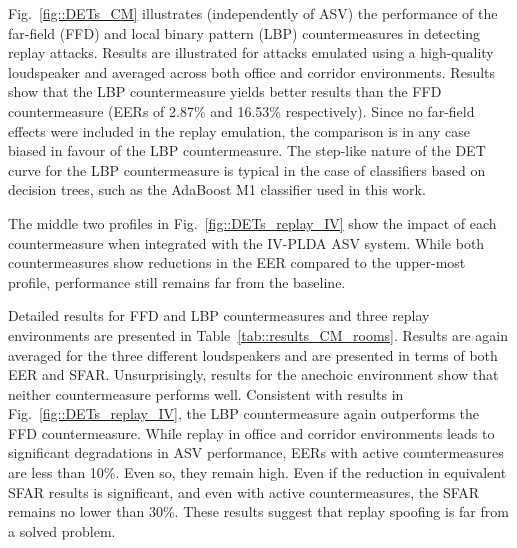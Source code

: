 Fig.~\ref{fig::DETs_CM} illustrates (independently of ASV) the performance of the far-field (FFD) and local binary pattern (LBP) countermeasures in detecting replay attacks.  Results are illustrated for attacks emulated using a high-quality loudspeaker and averaged across both office and corridor environments.  
Results show that the LBP countermeasure yields better results than the FFD countermeasure (EERs of 2.87\% and 16.53\% respectively).  Since no far-field effects were included in the replay emulation, the comparison is in any case biased in favour of the LBP countermeasure.  The step-like nature of the DET curve for the LBP countermeasure is typical in the case of classifiers based on decision trees, such as the AdaBoost M1 classifier used in this work.


The middle two profiles in Fig.~\ref{fig::DETs_replay_IV} show the impact of each countermeasure when integrated with the IV-PLDA ASV system.  %
While both countermeasures show reductions in the EER compared to the upper-most profile, performance still remains far from the baseline.


Detailed results for FFD and LBP countermeasures and three replay environments are presented in Table~\ref{tab::results_CM_rooms}.  Results are again averaged for the three different loudspeakers and are presented in terms of both EER and SFAR.  Unsurprisingly, results for the anechoic environment show that neither countermeasure performs well.  Consistent with results in Fig.~\ref{fig::DETs_replay_IV}, the LBP countermeasure again outperforms the FFD countermeasure.  While replay in office and corridor environments leads to significant degradations in ASV performance, EERs with active countermeasures are less than 10\%.  Even so, they remain high.  Even if the reduction in equivalent SFAR results is significant, and even with active countermeasures, the SFAR remains no lower than 30\%.  These results suggest that replay spoofing is far from a solved problem. %



